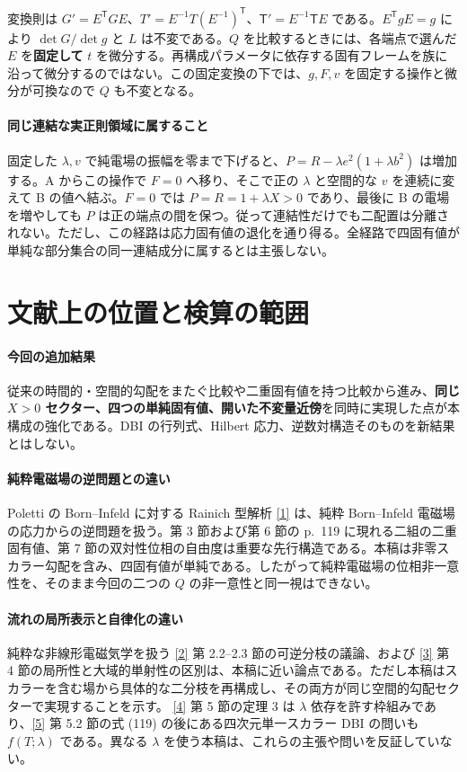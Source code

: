 \documentclass[11pt,a4paper]{article}
\newcommand{\Tmix}{\mathsf T}
\begin{document}
変換則は $G'=E^{\mathsf T}GE$、$T'=E^{-1}T(E^{-1})^{\mathsf T}$、$\Tmix'=E^{-1}\Tmix E$ である。$E^{\mathsf T}gE=g$ により $\det G/\det g$ と $L$ は不変である。$Q$ を比較するときには、各端点で選んだ $E$ を\textbf{固定して} $t$ を微分する。再構成パラメータに依存する固有フレームを族に沿って微分するのではない。この固定変換の下では、$g,F,v$ を固定する操作と微分が可換なので $Q$ も不変となる。

\paragraph{同じ連結な実正則領域に属すること}
固定した $\lambda,v$ で純電場の振幅を零まで下げると、$P=R-\lambda e^2(1+\lambda b^2)$ は増加する。A からこの操作で $F=0$ へ移り、そこで正の $\lambda$ と空間的な $v$ を連続に変えて B の値へ結ぶ。$F=0$ では $P=R=1+\lambda X>0$ であり、最後に B の電場を増やしても $P$ は正の端点の間を保つ。従って連結性だけでも二配置は分離されない。ただし、この経路は応力固有値の退化を通り得る。全経路で四固有値が単純な部分集合の同一連結成分に属するとは主張しない。


\newpage
\section{文献上の位置と検算の範囲}
\paragraph{今回の追加結果}
従来の時間的・空間的勾配をまたぐ比較や二重固有値を持つ比較から進み、\textbf{同じ $X>0$ セクター、四つの単純固有値、開いた不変量近傍}を同時に実現した点が本構成の強化である。DBI の行列式、Hilbert 応力、逆数対構造そのものを新結果とはしない。

\paragraph{純粋電磁場の逆問題との違い}
Poletti の Born--Infeld に対する Rainich 型解析 \href{https://www.numdam.org/item/AIHPA_1965__3_1_111_0.pdf}{[1]} は、純粋 Born--Infeld 電磁場の応力からの逆問題を扱う。第 3 節および第 6 節の p.~119 に現れる二組の二重固有値、第 7 節の双対性位相の自由度は重要な先行構造である。本稿は非零スカラー勾配を含み、四固有値が単純である。したがって純粋電磁場の位相非一意性を、そのまま今回の二つの $Q$ の非一意性と同一視はできない。

\paragraph{流れの局所表示と自律化の違い}
純粋な非線形電磁気学を扱う \href{https://arxiv.org/abs/2610.33887v1}{[2]} 第 2.2--2.3 節の可逆分枝の議論、および \href{https://arxiv.org/abs/2610.35135v1}{[3]} 第 4 節の局所性と大域的単射性の区別は、本稿に近い論点である。ただし本稿はスカラーを含む場から具体的な二分枝を再構成し、その両方が同じ空間的勾配セクターで実現することを示す。
\href{https://arxiv.org/abs/2309.04253v4}{[4]} 第 5 節の定理 3 は $\lambda$ 依存を許す枠組みであり、\href{https://arxiv.org/abs/2602.24058v2}{[5]} 第 5.2 節の式 (119) の後にある四次元単一スカラー DBI の問いも $f(T;\lambda)$ である。異なる $\lambda$ を使う本稿は、これらの主張や問いを反証していない。
\end{document}
